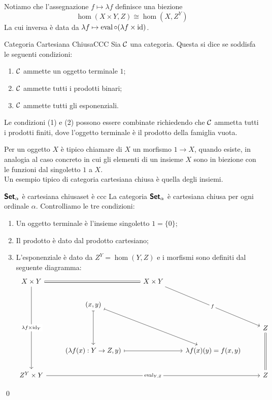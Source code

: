 \documentclass[openany]{book}
\renewcommand\C{\mc{C}}
\begin{document}
Notiamo che l'assegnazione $f\mapsto \lambda f$ definisce una biezione
\[ \hom(X\times Y, Z) \cong \hom(X, Z^Y) \]
La cui inversa è data da $\lambda f \mapsto \operatorname{eval}\circ (\lambda f \times \operatorname{id})$.

\begin{definition}{Categoria Cartesiana Chiusa}{CCC}
    Sia $\C$ una categoria. Questa si dice  se soddisfa le seguenti condizioni:\begin{enumerate}
        \item $\C$ ammette un oggetto terminale $1$;
        \item $\C$ ammette tutti i prodotti binari;
        \item $\C$ ammette tutti gli esponenziali.
    \end{enumerate}
    Le condizioni (1) e (2) possono essere combinate richiedendo che $\C$ ammetta tutti i prodotti finiti, dove l'oggetto terminale è il prodotto della famiglia vuota.
\end{definition}

Per un oggetto $X$ è tipico chiamare  di $X$ un morfismo $1\to X$, quando esiste, in analogia al caso concreto in cui gli elementi di un insieme $X$ sono in biezione con le funzioni dal singoletto $1$ a $X$.\\
Un esempio tipico di categoria cartesiana chiusa è quella degli insiemi.

\begin{example}{$\text{\sffamily\textbf{Set}}_\alpha$ è cartesiana chiusa}{set è ccc}
    La categoria $\text{\sffamily\textbf{Set}}_\alpha$ è cartesiana chiusa per ogni ordinale $\alpha$.
    \proof 
    Controlliamo le tre condizioni:\begin{enumerate}
        \item Un oggetto terminale è l'insieme singoletto $1 = \{0\}$;
        \item Il prodotto è dato dal prodotto cartesiano;
        \item L'esponenziale è dato da $Z^Y = \hom(Y,Z)$ e i morfismi sono definiti dal seguente diagramma:
        \[\begin{tikzcd}
        	{X\times Y} && {X\times Y} \\
	        & {(x,y)} \\
	        &&&& Z \\
	        & {(\lambda f(x):Y\to Z,y)} && {\lambda f(x)(y)=f(x,y)} \\
	        {Z^Y\times Y} &&&& Z
        	\arrow[equals, from=1-1, to=1-3]
	        \arrow["{\lambda f\times \id_Y}"{description}, from=1-1, to=5-1]
	        \arrow["f"{description}, from=1-3, to=3-5]
	        \arrow[maps to, from=2-2, to=4-2]
	        \arrow[maps to, from=2-2, to=4-4]
	        \arrow[maps to, from=4-2, to=4-4]
	        \arrow["{\eval_{Y,Z}}"{description}, from=5-1, to=5-5]
	        \arrow[equals, from=5-5, to=3-5]
        \end{tikzcd}\]
    \end{enumerate}
    \qed
\end{example}
\end{document}
